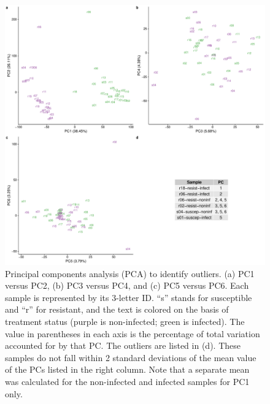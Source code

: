 \documentclass[fleqn,10pt]{wlscirep}
\begin{document}
\begin{figure}[ht]
\centering
\includegraphics[width=\linewidth]{../figure/outliers.pdf}
\caption{
Principal components analysis (PCA) to identify outliers. (a) PC1
versus PC2, (b) PC3 versus PC4, and (c) PC5 versus PC6. Each sample is
represented by its 3-letter ID. “s” stands for susceptible and “r” for
resistant, and the text is colored on the basis of treatment status
(purple is non-infected; green is infected). The value in parentheses
in each axis is the percentage of total variation accounted for by
that PC. The outliers are listed in (d). These samples do not fall
within 2 standard deviations of the mean value of the PCs listed in
the right column. Note that a separate mean was calculated for the
non-infected and infected samples for PC1 only.
}
\label{fig:outliers}
\end{figure}
\end{document}
